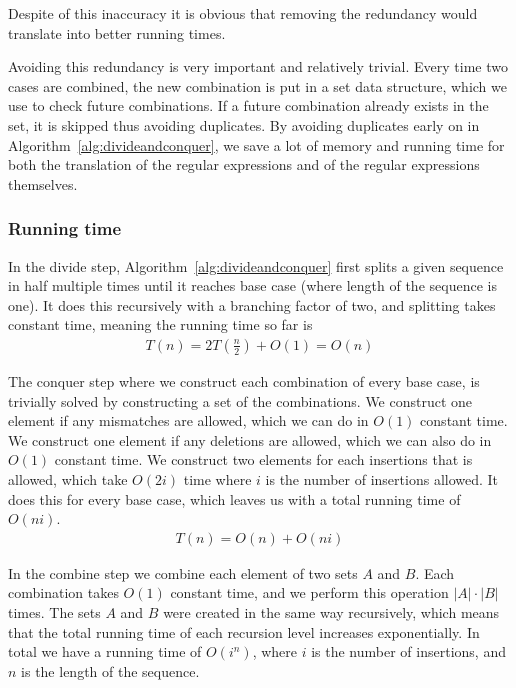 \documentclass[12pt]{article}
\theoremstyle{definition}
\begin{document}
Despite of this inaccuracy it is obvious that removing the redundancy would translate into better running times.

Avoiding this redundancy is very important and relatively trivial. Every time two cases are combined, the new combination is put in a set data structure, which we use to check future combinations. If a future combination already exists in the set, it is skipped thus avoiding duplicates. By avoiding duplicates early on in Algorithm~\ref{alg:divideandconquer}, we save a lot of memory and running time for both the translation of the regular expressions and of the regular expressions themselves.

\subsubsection{Running time}

In the divide step, Algorithm~\ref{alg:divideandconquer} first splits a given sequence in half multiple times until it reaches base case (where length of the sequence is one). It does this recursively with a branching factor of two, and splitting takes constant time, meaning the running time so far is 
\begin{eqnarray}
	T(n) = 2T(\frac{n}{2}) + O(1) = O(n)
\end{eqnarray}

The conquer step where we construct each combination of every base case, is trivially solved by constructing a set of the combinations. We construct one element if any mismatches are allowed, which we can do in $O(1)$ constant time. We construct one element if any deletions are allowed, which we can also do in $O(1)$ constant time. We construct two elements for each insertions that is allowed, which take $O(2i)$ time where $i$ is the number of insertions allowed. It does this for every base case, which leaves us with a total running time of $O(ni)$.
\begin{eqnarray}
	T(n) = O(n) + O(ni)
\end{eqnarray}

In the combine step we combine each element of two sets $A$ and $B$. Each combination takes $O(1)$ constant time, and we perform this operation $|A| \cdot |B|$ times. The sets $A$ and $B$ were created in the same way recursively, which means that the total running time of each recursion level increases exponentially. In total we have a running time of $O(i^n)$, where $i$ is the number of insertions, and $n$ is the length of the sequence.
\end{document}
